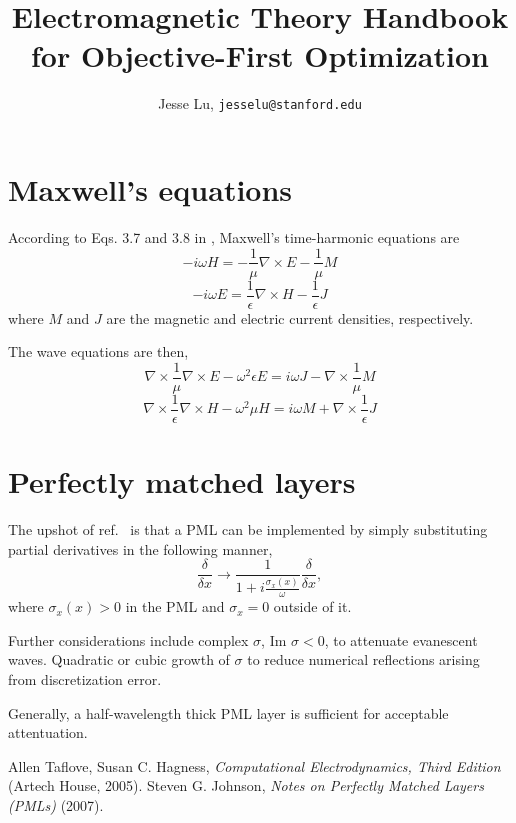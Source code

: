 \documentclass{article}
\title{Electromagnetic Theory Handbook for Objective-First Optimization}
\author{Jesse Lu, \texttt{jesselu@stanford.edu}}
\newcommand{\be}{\begin{equation}}
\newcommand{\ee}{\end{equation}}
\newcommand{\curl}{\nabla\times}
\newcommand{\eps}{\epsilon}
\newcommand{\inv}{\frac{1}}
\begin{document}
\maketitle
\tableofcontents

\section{Maxwell's equations}
According to Eqs. 3.7 and 3.8 in \cite{TH}, Maxwell's time-harmonic equations are
\be -i \omega H = -\inv{\mu} \curl E - \inv{\mu} M \ee
\be -i \omega E = \inv{\epsilon} \curl H - \inv{\eps} J \ee
where $M$ and $J$ are the magnetic and electric current densities, respectively.

The wave equations are then,
\be \curl \inv{\mu} \curl E - \omega^2 \eps E = i \omega J - 
    \curl \inv{\mu} M \ee
\be \curl \inv{\eps} \curl H - \omega^2 \mu H = i \omega M + 
    \curl \inv{\eps} J \ee

\section{Perfectly matched layers}
The upshot of ref.~\cite{SJ} is that a PML can be implemented by simply substituting partial derivatives in the following manner,
\be \frac{\delta}{\delta x} \rightarrow
    \inv{1 + i\frac{\sigma_x(x)}{\omega}} \frac{\delta}{\delta x}, \ee
where $\sigma_x(x) > 0$ in the PML and $\sigma_x = 0$ outside of it.

Further considerations include complex $\sigma$, $\text{Im }\sigma < 0$, to attenuate evanescent waves. Quadratic or cubic growth of $\sigma$ to reduce numerical reflections arising from discretization error. 

Generally, a half-wavelength thick PML layer is sufficient for acceptable attentuation.

\begin{thebibliography}{99}
 Allen Taflove, Susan C. Hagness, \emph{Computational Electrodynamics, Third Edition} (Artech House, 2005). 
 Steven G. Johnson, \emph{Notes on Perfectly Matched Layers (PMLs)} (2007).
\end{thebibliography}
\end{document}

